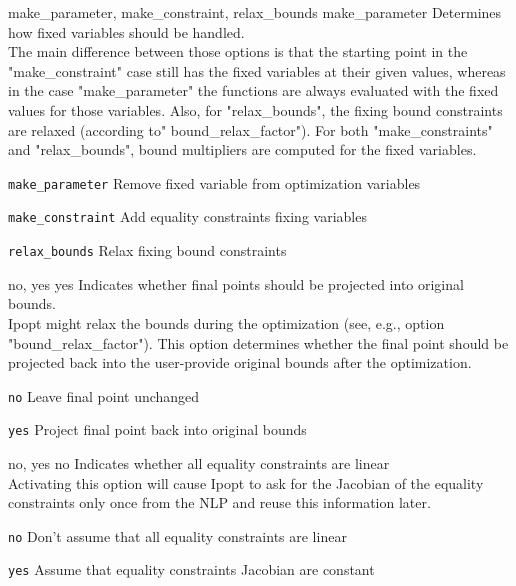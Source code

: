 %
{make\_parameter, make\_constraint, relax\_bounds}%
{make\_parameter}%
{Determines how fixed variables should be handled.\\
The main difference between those options is that the starting point in the "make\_constraint" case still has the fixed variables at their given values, whereas in the case "make\_parameter" the functions are always evaluated with the fixed values for those variables.  Also, for "relax\_bounds", the fixing bound constraints are relaxed (according to" bound\_relax\_factor"). For both "make\_constraints" and "relax\_bounds", bound multipliers are computed for the fixed variables.}%
{\begin{list}{}{
\setlength{\parsep}{0em}
\setlength{\leftmargin}{5ex}
\setlength{\labelwidth}{2ex}
\setlength{\itemindent}{0ex}
\setlength{\topsep}{0pt}}
\item[\texttt{make\_parameter}] Remove fixed variable from optimization variables
\item[\texttt{make\_constraint}] Add equality constraints fixing variables
\item[\texttt{relax\_bounds}] Relax fixing bound constraints
\end{list}
}

%
{no, yes}%
{yes}%
{Indicates whether final points should be projected into original bounds.\\
Ipopt might relax the bounds during the optimization (see, e.g., option "bound\_relax\_factor").  This option determines whether the final point should be projected back into the user-provide original bounds after the optimization.}%
{\begin{list}{}{
\setlength{\parsep}{0em}
\setlength{\leftmargin}{5ex}
\setlength{\labelwidth}{2ex}
\setlength{\itemindent}{0ex}
\setlength{\topsep}{0pt}}
\item[\texttt{no}] Leave final point unchanged
\item[\texttt{yes}] Project final point back into original bounds
\end{list}
}

%
{no, yes}%
{no}%
{Indicates whether all equality constraints are linear\\
Activating this option will cause Ipopt to ask for the Jacobian of the equality constraints only once from the NLP and reuse this information later.}%
{\begin{list}{}{
\setlength{\parsep}{0em}
\setlength{\leftmargin}{5ex}
\setlength{\labelwidth}{2ex}
\setlength{\itemindent}{0ex}
\setlength{\topsep}{0pt}}
\item[\texttt{no}] Don't assume that all equality constraints are linear
\item[\texttt{yes}] Assume that equality constraints Jacobian are constant
\end{list}
}

